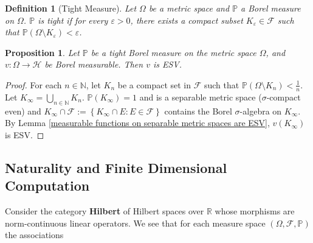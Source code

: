 \documentclass{article}
\numberwithin{theorem}{section}
\numberwithin{lemma}{section}
\newtheorem{definition}{Definition}
\numberwithin{definition}{section}
\numberwithin{assumption}{section}
\newtheorem{proposition}{Proposition}
\numberwithin{proposition}{section}
\numberwithin{remark}{section}
\numberwithin{corollary}{section}
\numberwithin{conjecture}{section}
\numberwithin{example}{section}
\newcommand{\R}{\mathbb{R}}
\newcommand{\N}{\mathbb{N}}
\newcommand{\bset}[1]{\left \lbrace #1 \right \rbrace}
\begin{document}
\begin{multicols*}{2}
\begin{definition} [Tight Measure] Let $\Omega$ be a metric space and $\mathbb P$ a Borel measure on $\Omega$. $\mathbb P$ is tight if for every $\varepsilon > 0$, there exists a compact subset $K_\varepsilon \in \mathcal F$ such that $\mathbb P (\Omega \setminus K_\varepsilon) < \varepsilon$.
\end{definition}

\begin{proposition}
    Let $\mathbb P$ be a tight Borel measure on the metric space $\Omega$, and $v: \Omega \to \mathcal H$ be Borel measurable. Then $v$ is ESV.
\end{proposition}

\begin{proof}
    For each $n \in \N$, let $K_n$ be a compact set in $\mathcal F$ such that $\mathbb P(\Omega \setminus K_n) < \frac 1 n$. Let $K_\infty = \bigcup_{n \in \N} K_n$. $\mathbb P(K_\infty) = 1$ and is a separable metric space ($\sigma$-compact even) and $K_\infty \cap \mathcal F := \bset{K_\infty \cap E: E \in \mathcal F}$ contains the Borel $\sigma$-algebra on $K_\infty$. By Lemma \ref{measurable functions on separable metric spaces are ESV}, $v(K_\infty)$ is ESV. 
\end{proof}

\subsection{Naturality and Finite Dimensional Computation} \label{Naturality and Finite Dimensional Truncation}

Consider the category \textbf{Hilbert} of Hilbert spaces over $\R$ whose morphisms are norm-continuous linear operators. We see that for each measure space $(\Omega, \mathcal F, \mathbb P)$ the associations 


\end{multicols*}
\end{document}
